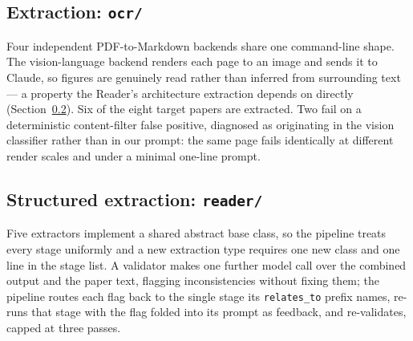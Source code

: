 \documentclass[11pt]{article}
\begin{document}
\subsection{Extraction: \texttt{ocr/}}

Four independent PDF-to-Markdown backends share one command-line shape. The
vision-language backend renders each page to an image and sends it to Claude, so figures
are genuinely read rather than inferred from surrounding text --- a property the Reader's
architecture extraction depends on directly (Section~\ref{sec:reader}). Six of the eight
target papers are extracted. Two fail on a deterministic content-filter false positive,
diagnosed as originating in the vision classifier rather than in our prompt: the same
page fails identically at different render scales and under a minimal one-line prompt.

\subsection{Structured extraction: \texttt{reader/}}
\label{sec:reader}

Five extractors implement a shared abstract base class, so the pipeline treats every
stage uniformly and a new extraction type requires one new class and one line in the
stage list. A validator makes one further model call over the combined output and the
paper text, flagging inconsistencies without fixing them; the pipeline routes each flag
back to the single stage its \texttt{relates\_to} prefix names, re-runs that stage with
the flag folded into its prompt as feedback, and re-validates, capped at three passes.
\end{document}
